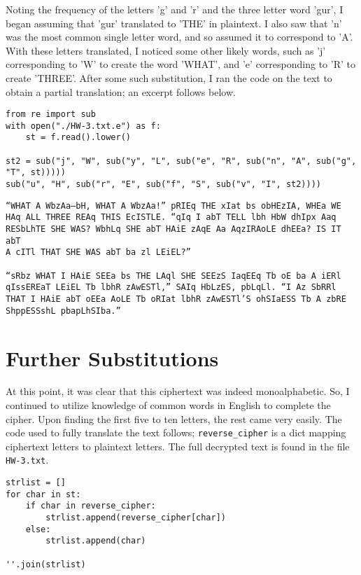 \documentclass[11pt]{article}
\begin{document}
Noting the frequency of the letters 'g' and 'r' and the three letter
word 'gur', I began assuming that 'gur' translated to 'THE' in
plaintext. I also saw that 'n' was the most common single letter word,
and so assumed it to correspond to 'A'. With these letters translated,
I noticed some other likely words, such as 'j' corresponding to 'W' to
create the word 'WHAT', and 'e' corresponding to 'R' to create
'THREE'. After some such substitution, I ran the code on the text to
obtain a partial translation; an excerpt follows below.

\begin{verbatim}
from re import sub
with open("./HW-3.txt.e") as f:
    st = f.read().lower()

st2 = sub("j", "W", sub("y", "L", sub("e", "R", sub("n", "A", sub("g", "T", st)))))
sub("u", "H", sub("r", "E", sub("f", "S", sub("v", "I", st2))))
\end{verbatim}

\begin{verbatim}
“WHAT A WbzAa—bH, WHAT A WbzAa!” pRIEq THE xIat bs obHEzIA, WHEa WE
HAq ALL THREE REAq THIS EcISTLE. “qIq I abT TELL lbh HbW dhIpx Aaq
RESbLhTE SHE WAS? WbhLq SHE abT HAiE zAqE Aa AqzIRAoLE dhEEa? IS IT abT
A cITl THAT SHE WAS abT ba zl LEiEL?”

“sRbz WHAT I HAiE SEEa bs THE LAql SHE SEEzS IaqEEq Tb oE ba A iERl
qIssEREaT LEiEL Tb lbhR zAwESTl,” SAIq HbLzES, pbLqLl. “I Az SbRRl
THAT I HAiE abT oEEa AoLE Tb oRIat lbhR zAwESTl’S ohSIaESS Tb A zbRE
ShppESSshL pbapLhSIba.”
\end{verbatim}

\section{Further Substitutions}
\label{sec-3}
At this point, it was clear that this ciphertext was indeed
monoalphabetic. So, I continued to utilize knowledge of common words
in English to complete the cipher. Upon finding the first five to ten
letters, the rest came very easily. The code used to fully translate
the text follows; \verb~reverse_cipher~ is a dict mapping ciphertext
letters to plaintext letters. The full decrypted text is found in the
file \verb~HW-3.txt~.

\begin{verbatim}
strlist = []
for char in st:
    if char in reverse_cipher:
        strlist.append(reverse_cipher[char])
    else:
        strlist.append(char)

''.join(strlist)
\end{verbatim}
\end{document}
